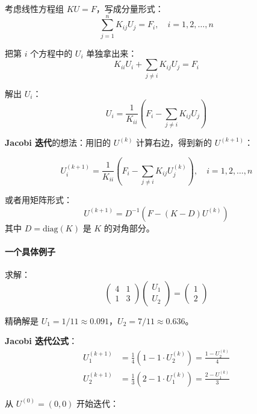 考虑线性方程组 $KU = F$，写成分量形式：
\[
\sum_{j=1}^{n} K_{ij} U_j = F_i, \quad i = 1, 2, \ldots, n
\]

把第 $i$ 个方程中的 $U_i$ 单独拿出来：
\[
K_{ii} U_i + \sum_{j \neq i} K_{ij} U_j = F_i
\]

解出 $U_i$：
\[
U_i = \frac{1}{K_{ii}} \left( F_i - \sum_{j \neq i} K_{ij} U_j \right)
\]

\textbf{Jacobi 迭代}的想法：用旧的 $U^{(k)}$ 计算右边，得到新的 $U^{(k+1)}$：

\begin{tcolorbox}[colback=gray!5, colframe=gray!60, title=Jacobi 迭代]
\begin{equation}
U_i^{(k+1)} = \frac{1}{K_{ii}} \left( F_i - \sum_{j \neq i} K_{ij} U_j^{(k)} \right), \quad i = 1, 2, \ldots, n
\end{equation}

或者用矩阵形式：
\[
U^{(k+1)} = D^{-1}(F - (K-D)U^{(k)})
\]
其中 $D = \text{diag}(K)$ 是 $K$ 的对角部分。
\end{tcolorbox}

\paragraph{一个具体例子}

求解：
\[
\begin{pmatrix} 4 & 1 \\ 1 & 3 \end{pmatrix} \begin{pmatrix} U_1 \\ U_2 \end{pmatrix} = \begin{pmatrix} 1 \\ 2 \end{pmatrix}
\]

精确解是 $U_1 = 1/11 \approx 0.091$，$U_2 = 7/11 \approx 0.636$。

\textbf{Jacobi 迭代公式}：
\begin{align}
U_1^{(k+1)} &= \frac{1}{4}\left(1 - 1 \cdot U_2^{(k)}\right) = \frac{1 - U_2^{(k)}}{4} \\
U_2^{(k+1)} &= \frac{1}{3}\left(2 - 1 \cdot U_1^{(k)}\right) = \frac{2 - U_1^{(k)}}{3}
\end{align}

从 $U^{(0)} = (0, 0)$ 开始迭代：

